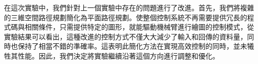 \documentclass[class=NCU_thesis, crop=false]{standalone}
\begin{document}

在這次實驗中，我們針對上一個實驗中存在的問題進行了改進。首先，我們將複雜的三維空間路徑規劃簡化為平面路徑規劃。使整個控制系統不再需要提供冗長的程式碼與相關條件，只需提供特定的圖形，就能驅動機械臂進行繪圖的控制模式，從實驗結果可以看出，這種改進的控制方式不僅大大減少了輸入和回傳的資料量，同時也保持了相當不錯的準確率。這表明此簡化方法在實現高效控制的同時，並未犧牲其性能。因此，我們決定將實驗繼續沿著這個方向進行調整和優化。
\end{document}
